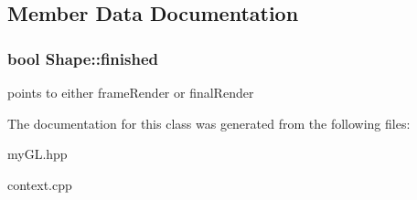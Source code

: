 \subsection{Member Data Documentation}
\subsubsection[{\texorpdfstring{finished}{finished}}]{\setlength{\rightskip}{0pt plus 5cm}bool Shape\+::finished}\hypertarget{classShape_ad766ebc1fafeb7f6c76d37ccfed88be4}{}\label{classShape_ad766ebc1fafeb7f6c76d37ccfed88be4}
points to either frame\+Render or final\+Render 

The documentation for this class was generated from the following files\+:\begin{DoxyCompactItemize}
\item 
my\+G\+L.\+hpp\item 
context.\+cpp\end{DoxyCompactItemize}
